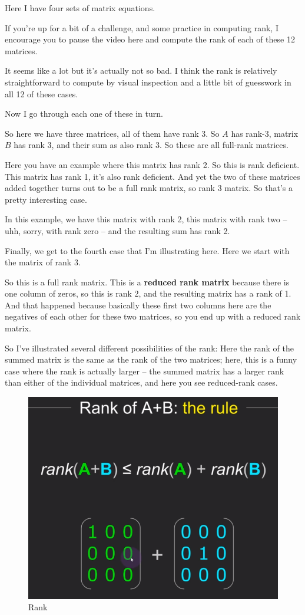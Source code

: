 \documentclass[fleqn,10pt]{olplainarticle}
\theoremstyle{definition}
\theoremstyle{remark}
\begin{document}
Here I have four sets of matrix equations.

If you're up for a bit of a challenge, and some practice in computing rank, I encourage you to pause the video here and compute the rank of each of these 12 matrices. 

It seems like a lot but it's actually not so bad. I think the rank is relatively straightforward to compute by visual inspection and a little bit of guesswork in all 12 of these cases.

Now I go through each one of these in turn. 

So here we have three matrices, all of them have rank 3. So $A$ has rank-3, matrix $B$ has rank 3, and their sum as also rank 3. So these are all full-rank matrices.

Here you have an example where this matrix has rank 2. So this is rank deficient. This matrix has rank 1, it's also rank deficient. And yet the two of these matrices added together turns out to be a full rank matrix, so rank 3 matrix. So that's a pretty interesting case. 

In this example, we have this matrix with rank 2, this matrix with rank two -- uhh, sorry, with rank zero -- and the resulting sum has rank 2.

Finally, we get to the fourth case that I'm illustrating here. Here we start with the matrix of rank 3.

So this is a full rank matrix. This is a \textbf{reduced rank matrix} because there is one column of zeros, so this is rank 2, and the resulting matrix has a rank of 1. And that happened because basically these first two columns here are the negatives of each other for these two matrices, so you end up with a reduced rank matrix.

So I've illustrated several different possibilities of the rank: Here the rank of the summed matrix is the same as the rank of the two matrices; here, this is a funny case where the rank is actually larger -- the summed matrix has a larger rank than either of the individual matrices, and here you see reduced-rank cases.

\begin{figure}[ht]
	\centering
	\includegraphics[width=0.4\linewidth]{images/rank-19.png}
	\caption{Rank}
	\label{fig:rank_19}
\end{figure}
\end{document}
